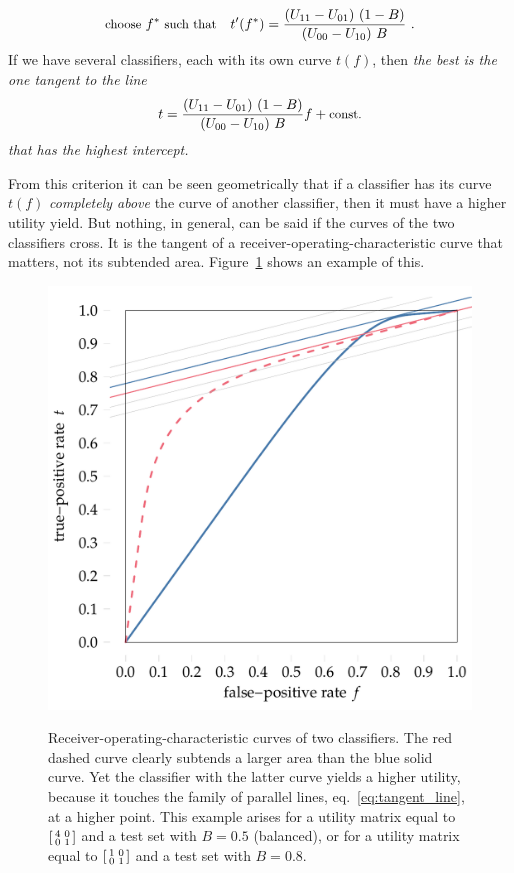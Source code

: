 \documentclass[\ifafour a4paper,12pt,\else a5paper,10pt,\fi%
onecolumn,oneside,article,%
british%
]{memoir}
\theoremstyle{remark}
\theoremstyle{innote}
\renewcommand*{\|}[1][]{\nonscript\:#1\vert\nonscript\:\mathopen{}}
\newcommand*{\eqn}{eq.}%
\begin{document}
\begin{equation}
  \label{eq:threshold_auc_maxutility_derivat}
  \text{\small choose } f^{*} \text{\small\ such that}\quad
t'(f^{*}) = \frac{(U_{11} - U_{01})\ (1-B)}{(U_{00} - U_{10})\  B} \ .
\end{equation}
If we have several classifiers, each with its own curve $t(f)$, then \emph{the best is the one tangent to the line
\begin{equation}
  \label{eq:tangent_line}
  t = \frac{(U_{11} - U_{01})\ (1-B)}{(U_{00} - U_{10})\  B} f + \text{\normalfont\small const.}
\end{equation}
that has the highest intercept.}

From this criterion it can be seen geometrically that if a classifier has its curve $t(f)$ \emph{completely above} the curve of another classifier, then it must have a higher utility yield. But nothing, in general, can be said if the curves of the two classifiers cross. It is the tangent of a receiver-operating-characteristic curve that matters, not its subtended area. Figure~\ref{fig:auc_example} shows an example of this.
\begin{figure}[t]
  \centering
    \includegraphics[width=0.66\linewidth]{auc_example.pdf}\\
    \caption{Receiver-operating-characteristic curves of two classifiers. The {\color{red}red dashed curve} clearly subtends a larger area than the {\color{blue}blue solid curve}. Yet the classifier with the latter curve yields a higher utility, because it touches the family of parallel lines, \eqn~\eqref{eq:tangent_line}, at a higher point. This example arises for a utility matrix equal to $\begin{bsmallmatrix} 4&0\\0&1 \end{bsmallmatrix}$ and a test set with $B=0.5$ (balanced), or for a utility matrix equal to $\begin{bsmallmatrix} 1&0\\0&1 \end{bsmallmatrix}$ and a test set with $B=0.8$.}
  \label{fig:auc_example}
\end{figure}
\end{document}
